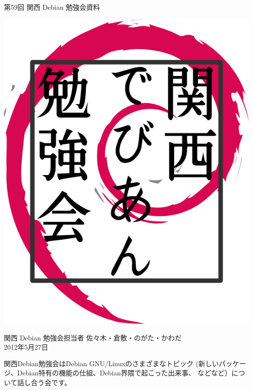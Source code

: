 \documentclass[mingoth,a4paper]{jsarticle}
\newcommand{\debmtgyear}{2012}
\newcommand{\debmtgdate}{27}
\newcommand{\debmtgmonth}{5}
\newcommand{\debmtgnumber}{59}
\begin{document}
\begin{titlepage}


 第\debmtgnumber{}回 関西 Debian 勉強会資料

\vspace{2cm}

\begin{center}
\includegraphics{image200802/kansaidebianlogo.png}
\end{center}

\begin{flushright}
\hfill{}関西 Debian 勉強会担当者 佐々木・倉敷・のがた・かわだ \\
\hfill{}\debmtgyear{}年\debmtgmonth{}月\debmtgdate{}日
\end{flushright}

\thispagestyle{empty}
\end{titlepage}


 関西Debian勉強会はDebian GNU/Linuxのさまざまなトピック
 (新しいパッケージ、Debian特有の機能の仕組、Debian界隈で起こった出来事、
 などなど）について話し合う会です。
\end{document}

